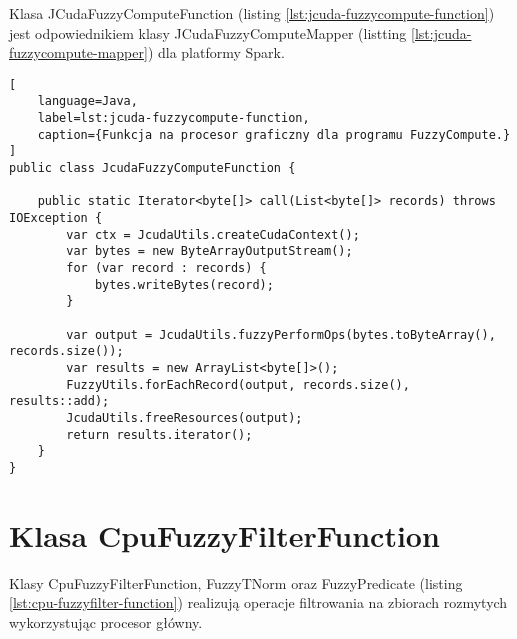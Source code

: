 Klasa JCudaFuzzyComputeFunction (listing \ref{lst:jcuda-fuzzycompute-function}) jest odpowiednikiem
klasy JCudaFuzzyComputeMapper (listting \ref{lst:jcuda-fuzzycompute-mapper}) dla platformy Spark.

\begin{lstlisting}[
    language=Java,
    label=lst:jcuda-fuzzycompute-function,
    caption={Funkcja na procesor graficzny dla programu FuzzyCompute.}
]
public class JcudaFuzzyComputeFunction {

    public static Iterator<byte[]> call(List<byte[]> records) throws IOException {
        var ctx = JcudaUtils.createCudaContext();
        var bytes = new ByteArrayOutputStream();
        for (var record : records) {
            bytes.writeBytes(record);
        }

        var output = JcudaUtils.fuzzyPerformOps(bytes.toByteArray(), records.size());
        var results = new ArrayList<byte[]>();
        FuzzyUtils.forEachRecord(output, records.size(), results::add);
        JcudaUtils.freeResources(output);
        return results.iterator();
    }
}
\end{lstlisting}
\newpage

\section*{Klasa CpuFuzzyFilterFunction} \label{ch:cpu-fuzzyfilter-function}

Klasy CpuFuzzyFilterFunction, FuzzyTNorm oraz FuzzyPredicate (listing \ref{lst:cpu-fuzzyfilter-function})
realizują operacje filtrowania na zbiorach rozmytych wykorzystując procesor główny.

